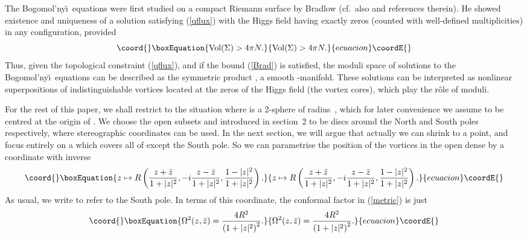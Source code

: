 \documentclass[a4paper,11pt]{article}
\begin{document}
The Bogomol'ny\u \i\ equations were first studied on a compact Riemann 
surface \myHighlight{$\Sigma$}\coordHE{} by Bradlow \cite{Br} (cf.~also \cite{GP} and
references therein). 
He showed existence and  uniqueness of a 
solution satisfying (\ref{qflux}) with the Higgs field having exactly 
\coordHE{} zeros (counted with well-defined
multiplicities) in any configuration, provided
\begin{equation}\coord{}\boxEquation{\label{Brad}
{\rm Vol}(\Sigma) > 4\pi N.
}{{\rm Vol}(\Sigma) > 4\pi N.
}{ecuacion}\coordE{}\end{equation}
Thus, given the topological constraint (\ref{qflux}), and
if the bound (\ref{Brad}) is satisfied, the moduli space of
solutions to the Bogomol'ny\u\i\ equations 
can be described as the
symmetric product \coordHE{}, 
a smooth \coordHE{}-manifold. These solutions can be interpreted as
nonlinear superpositions of \coordHE{} indistinguishable vortices
located at the zeros of the Higgs field (the vortex cores), which play
the r\^ole of moduli. 


For the rest of this paper, we shall restrict to the situation where
\myHighlight{$\Sigma$}\coordHE{} is a 2-sphere of radius~\coordHE{}, which for later convenience we
assume to be centred at the origin of \coordHE{}. We choose
the open subsets \coordHE{} and \coordHE{} introduced in section~2 to be
discs around the North and South poles
respectively, where stereographic coordinates can be used.
In the next section, we will argue that actually we can shrink \coordHE{}
to a point, and focus entirely on a \coordHE{} which covers all of \myHighlight{$\Sigma$}\coordHE{}
except the South pole. So we can parametrise the position of the
vortices in the open dense \coordHE{} by a coordinate \coordHE{} with inverse 
\begin{equation}\coord{}\boxEquation{ \label{cartes}
z\mapsto R\left(   
\frac{z+\bar{z}}{1+|z|^{2}},
-i\frac{z-\bar{z}}{1+|z|^{2}},
\frac{1-|z|^{2}}{1+|z|^{2}}
\right).
}{ z\mapsto R\left(   
\frac{z+\bar{z}}{1+|z|^{2}},
-i\frac{z-\bar{z}}{1+|z|^{2}},
\frac{1-|z|^{2}}{1+|z|^{2}}
\right).
}{ecuacion}\coordE{}\end{equation}
As usual, we write \coordHE{} to refer to the South pole.
In terms of this coordinate, the conformal factor in (\ref{metric}) is just
\begin{equation}\coord{}\boxEquation{\label{conffactor}
\Omega^{2}(z,\bar{z})=\frac{4R^{2}}{\left(1+|z|^{2}\right)^{2}}.
}{\Omega^{2}(z,\bar{z})=\frac{4R^{2}}{\left(1+|z|^{2}\right)^{2}}.
}{ecuacion}\coordE{}\end{equation}
\end{document}
